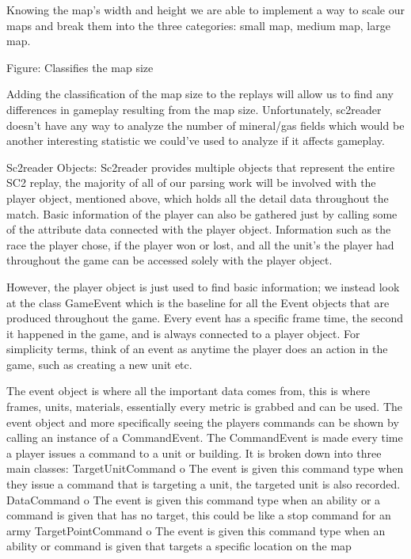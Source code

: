 \documentclass[a4paper,12pt]{report}
\begin{document}
Knowing the map’s width and height we are able to implement a way to scale our maps and break them into the three categories: small map, medium map, large map.


Figure: Classifies the map size

Adding the classification of the map size to the replays will allow us to find any differences in gameplay resulting from the map size. Unfortunately, sc2reader doesn’t have any way to analyze the number of mineral/gas fields which would be another interesting statistic we could’ve used to analyze if it affects gameplay.


Sc2reader Objects:
Sc2reader provides multiple objects that represent the entire SC2 replay, the majority of all of our parsing work will be involved with the player object, mentioned above,  which holds all the detail data throughout the match. Basic information of the player can also be gathered just by calling some of the attribute data connected with the player object. Information such as the race the player chose, if the player won or lost, and all the unit’s the player had throughout the game can be accessed solely with the player object.

However, the player object is just used to find basic information; we instead look at the class GameEvent which is the baseline for all the Event objects that are produced throughout the game. Every event has a specific frame time, the second it happened in the game, and is always connected to a player object. For simplicity terms, think of an event as anytime the player does an action in the game, such as creating a new unit etc.

The event object is where all the important data comes from, this is where frames, units, materials, essentially every metric is grabbed and can be used. The event object and more specifically seeing the players commands can be shown by calling an instance of a CommandEvent. The CommandEvent is made every time a player issues a command to a unit or building. It is broken down into three main classes:
TargetUnitCommand
o   The event is given this command type when they issue a command that is targeting a unit, the targeted unit is also recorded.
  DataCommand
o   The event is given this command type when an ability or a command is given that has no target, this could be like a stop command for an army
 TargetPointCommand
o   The event is given this command type when an ability or command is given that targets a specific location on the map
\end{document}

